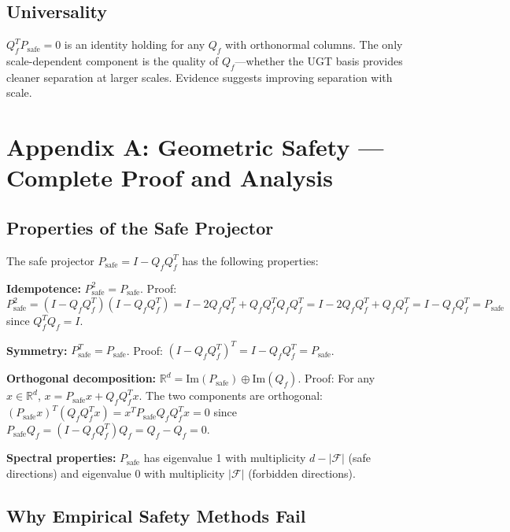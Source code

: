 \documentclass[11pt,a4paper]{article}
\theoremstyle{plain}\newtheorem{theorem}{Theorem}[section]
\begin{document}
\subsection{Universality}
$Q_f^T P_{\mathrm{safe}} = 0$ is an identity holding for any $Q_f$ with orthonormal columns. The only scale-dependent component is the quality of $Q_f$---whether the UGT basis provides cleaner separation at larger scales. Evidence suggests improving separation with scale.

\newpage

\newpage

\section{Appendix A: Geometric Safety --- Complete Proof and Analysis}

\subsection{Properties of the Safe Projector}

The safe projector $P_{\mathrm{safe}} = I - Q_f Q_f^T$ has the following properties:

\textbf{Idempotence:} $P_{\mathrm{safe}}^2 = P_{\mathrm{safe}}$. Proof: $P_{\mathrm{safe}}^2 = (I - Q_f Q_f^T)(I - Q_f Q_f^T) = I - 2Q_f Q_f^T + Q_f Q_f^T Q_f Q_f^T = I - 2Q_f Q_f^T + Q_f Q_f^T = I - Q_f Q_f^T = P_{\mathrm{safe}}$ since $Q_f^T Q_f = I$.

\textbf{Symmetry:} $P_{\mathrm{safe}}^T = P_{\mathrm{safe}}$. Proof: $(I - Q_f Q_f^T)^T = I - Q_f Q_f^T = P_{\mathrm{safe}}$.

\textbf{Orthogonal decomposition:} $\mathbb{R}^d = \mathrm{Im}(P_{\mathrm{safe}}) \oplus \mathrm{Im}(Q_f)$. Proof: For any $x \in \mathbb{R}^d$, $x = P_{\mathrm{safe}} x + Q_f Q_f^T x$. The two components are orthogonal: $(P_{\mathrm{safe}} x)^T (Q_f Q_f^T x) = x^T P_{\mathrm{safe}} Q_f Q_f^T x = 0$ since $P_{\mathrm{safe}} Q_f = (I - Q_f Q_f^T) Q_f = Q_f - Q_f = 0$.

\textbf{Spectral properties:} $P_{\mathrm{safe}}$ has eigenvalue 1 with multiplicity $d - |\mathcal{F}|$ (safe directions) and eigenvalue 0 with multiplicity $|\mathcal{F}|$ (forbidden directions).

\subsection{Why Empirical Safety Methods Fail}
\end{document}
